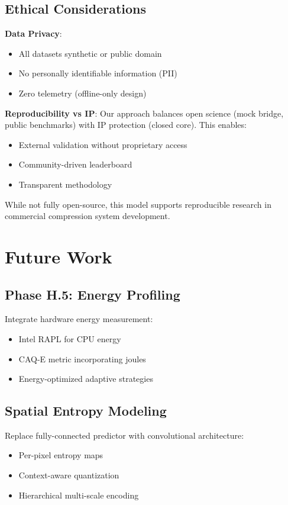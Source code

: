 \documentclass[11pt,twocolumn]{article}
\begin{document}
\subsection{Ethical Considerations}

\textbf{Data Privacy}:
\begin{itemize}
    \item All datasets synthetic or public domain
    \item No personally identifiable information (PII)
    \item Zero telemetry (offline-only design)
\end{itemize}

\textbf{Reproducibility vs IP}:
Our approach balances open science (mock bridge, public benchmarks) with IP protection (closed core). This enables:
\begin{itemize}
    \item External validation without proprietary access
    \item Community-driven leaderboard
    \item Transparent methodology
\end{itemize}

While not fully open-source, this model supports reproducible research in commercial compression system development.

\section{Future Work}

\subsection{Phase H.5: Energy Profiling}

Integrate hardware energy measurement:
\begin{itemize}
    \item Intel RAPL for CPU energy
    \item CAQ-E metric incorporating joules
    \item Energy-optimized adaptive strategies
\end{itemize}

\subsection{Spatial Entropy Modeling}

Replace fully-connected predictor with convolutional architecture:
\begin{itemize}
    \item Per-pixel entropy maps
    \item Context-aware quantization
    \item Hierarchical multi-scale encoding
\end{itemize}
\end{document}
